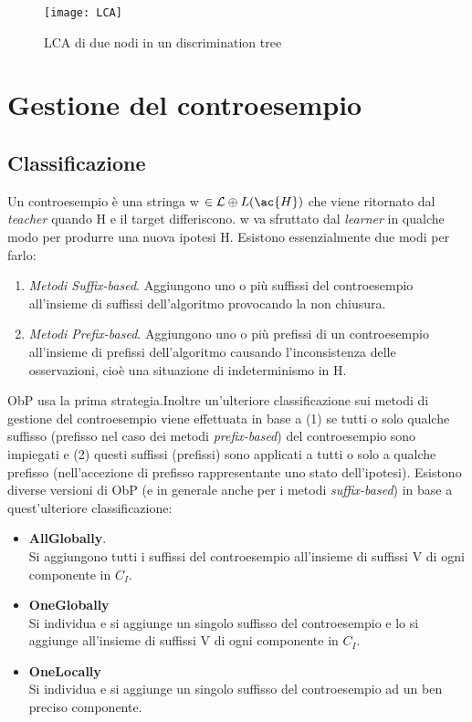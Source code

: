 \begin{figure}[htp]
	\centering
	\texttt{[image: LCA]}
	\caption[LCA di due nodi]{LCA di due nodi in un discrimination tree}
   \label{fig:lca}
\end{figure}
\section[Gestione Controesempio]{Gestione del controesempio}
\subsection{Classificazione}
\label{sub:cla}
Un controesempio è una stringa  w $\in \mathcal{L} \oplus L(\ac{H})$ che viene ritornato dal \textit{teacher} quando \ac{H} e il target differiscono. w va sfruttato dal \textit{learner} in qualche modo per produrre una nuova ipotesi \ac{H}. Esistono essenzialmente due modi per farlo: 
\begin{enumerate}
\item \textit{Metodi Suffix-based}. Aggiungono uno o più suffissi del controesempio all'insieme di suffissi dell'algoritmo provocando la non chiusura.
\item \textit{Metodi Prefix-based}. Aggiungono uno o più prefissi di un controesempio all'insieme di prefissi dell'algoritmo causando l'inconsistenza delle osservazioni, cioè una situazione di indeterminismo in \ac{H}.
\end{enumerate}
\ac{ObP} usa la prima strategia.Inoltre un'ulteriore classificazione sui metodi di gestione del controesempio viene effettuata in base a (1) se tutti o solo qualche suffisso (prefisso nel caso dei metodi \textit{prefix-based}) del controesempio sono impiegati e (2) questi suffissi (prefissi) sono applicati a tutti o solo a qualche prefisso (nell'accezione di prefisso rappresentante uno stato dell'ipotesi). Esistono diverse versioni di \ac{ObP} (e in generale anche per i metodi \textit{suffix-based}) in base  a quest'ulteriore classificazione:
\begin{itemize}
\item \textbf{AllGlobally}.\\Si aggiungono tutti i suffissi del controesempio all'insieme di suffissi V di ogni componente in $C_I$.
\item \textbf{OneGlobally}\\Si individua e si aggiunge un singolo suffisso del controesempio e lo si aggiunge all'insieme di suffissi V di ogni componente in $C_I$.
\item \textbf{OneLocally}\\Si individua e si aggiunge un singolo suffisso del controesempio ad un ben preciso componente.
\end{itemize}
